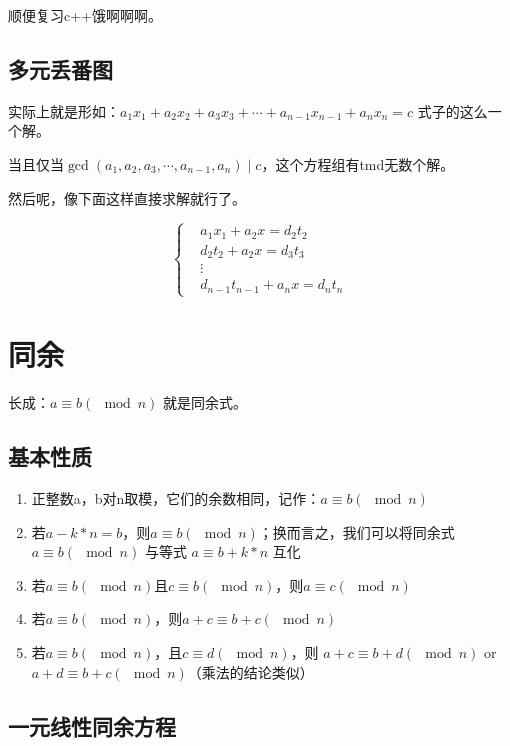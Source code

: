 \documentclass[12pt]{article}
\begin{document}
顺便复习c++饿啊啊啊。

\subsection{多元丢番图}

实际上就是形如：$a_{1}x_{1}+a_{2}x_{2}+a_{3}x_{3}+\cdots+a_{n-1}x_{n-1}+a_{n}x_{n}=c$ 式子的这么一个解。

当且仅当$\gcd(a_{1},a_{2},a_{3},\cdots,a_{n-1},a_{n}) \mid c$，这个方程组有tmd无数个解。

然后呢，像下面这样直接求解就行了。


\begin{displaymath}
    \left\{
        \begin{aligned}
            &a_{1}x_{1}+a_{2}x=d_2t_2\\
            &d_{2}t_{2}+a_{2}x=d_3t_3\\
            &\vdots\\
            &d_{n-1}t_{n-1}+a_{n}x=d_nt_n
        \end{aligned}
    \right.
\end{displaymath}


\section{同余}
长成：$a\equiv b(\mod n)$ 就是同余式。

\subsection{基本性质}

\begin{enumerate}
    \item 正整数a，b对n取模，它们的余数相同，记作：$a\equiv b(\mod n)$
    \item 若$a-k*n=b$，则$a\equiv b(\mod n)$；换而言之，我们可以将同余式 $a\equiv b(\mod n)$ 与等式 $a\equiv b+k*n$ 互化
    \item 若$a\equiv b(\mod n)$且$c\equiv b(\mod n)$，则$a\equiv c(\mod n)$
    \item 若$a\equiv b(\mod n)$，则$a+c\equiv b+c(\mod n)$ 
    \item 若$a\equiv b(\mod n)$，且$c\equiv d(\mod n)$，则 $a+c\equiv b+d(\mod n)$ or $a+d\equiv b+c(\mod n)$（乘法的结论类似）
\end{enumerate}


\subsection{一元线性同余方程}
\end{document}
